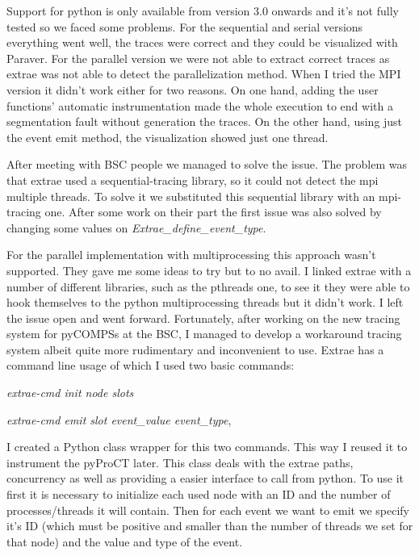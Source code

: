 Support for python is only available from version 3.0 onwards and it's not fully tested so we faced some problems. For the sequential and serial versions everything went well, the traces  were correct and they could be visualized with Paraver. For the parallel version we were not able to extract correct traces as extrae was not able to detect the parallelization method. When I tried the MPI version it didn't work either for two reasons. On one hand, adding the user functions' automatic instrumentation made the whole execution to end with a segmentation fault without generation the traces. On the other hand, using just the event emit method, the visualization showed just one thread. 

After meeting with BSC people we managed to solve the issue. The problem was that extrae used a sequential-tracing library, so it could not detect the mpi multiple threads. To solve it we substituted this sequential library with an mpi-tracing one. After some work on their part the first issue was also solved by changing some values on \textit{Extrae\_define\_event\_type}. 

For the parallel implementation with multiprocessing this approach wasn't supported. They gave me some ideas to try but to no avail. I linked extrae with a number of different libraries, such as the pthreads one, to see it they were able to hook themselves to the python multiprocessing threads but it didn't work. I left the issue open and went forward. Fortunately, after working on the new tracing system for pyCOMPSs at the BSC, I managed to develop a workaround tracing system albeit quite more rudimentary and inconvenient to use. Extrae has a command line usage of which I used two basic commands:

\textit{extrae-cmd init node slots}

\textit{extrae-cmd emit slot event\_value event\_type}, 

I created a Python class wrapper for this two commands. This way I reused it to instrument the pyProCT later. This class deals with the extrae paths, concurrency as well as providing a easier interface to call from python. To use it first it is necessary to initialize each used node with an ID and the number of processes/threads it will contain. Then for each event we want to emit we specify it's ID (which must be positive and smaller than the number of threads we set for that node) and the value and type of the event. 

